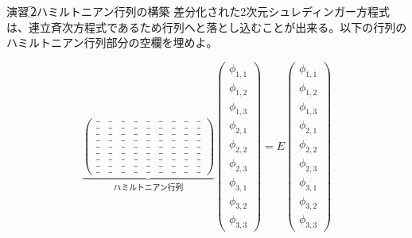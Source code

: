 \documentclass{beamer}
\begin{document}
\begin{frame}{演習\,\textcircled{2}\quad ハミルトニアン行列の構築}
    差分化された2次元シュレディンガー方程式は、連立斉次方程式であるため行列へと落とし込むことが出来る。以下の行列のハミルトニアン行列部分の空欄を埋めよ。
    \vspace{0.5em}
    
    \scriptsize
    $$
    \underbrace{
    \begin{pmatrix}
    \_ & \_ & \_ & \_ & \_ & \_ & \_ & \_ & \_ \\
    \_ & \_ & \_ & \_ & \_ & \_ & \_ & \_ & \_ \\
    \_ & \_ & \_ & \_ & \_ & \_ & \_ & \_ & \_ \\
    \hline
    \_ & \_ & \_ & \_ & \_ & \_ & \_ & \_ & \_ \\
    \_ & \_ & \_ & \_ & \_ & \_ & \_ & \_ & \_ \\
    \_ & \_ & \_ & \_ & \_ & \_ & \_ & \_ & \_ \\
    \hline
    \_ & \_ & \_ & \_ & \_ & \_ & \_ & \_ & \_ \\
    \_ & \_ & \_ & \_ & \_ & \_ & \_ & \_ & \_ \\
    \_ & \_ & \_ & \_ & \_ & \_ & \_ & \_ & \_ 
    \end{pmatrix}
    }_{\text{ハミルトニアン行列}}
    \begin{pmatrix}
    \phi_{1,1} \\ \phi_{1,2} \\ \phi_{1,3} \\
    \hline
    \phi_{2,1} \\ \phi_{2,2} \\ \phi_{2,3} \\
    \hline
    \phi_{3,1} \\ \phi_{3,2} \\ \phi_{3,3}
    \end{pmatrix}
    =
    E
    \begin{pmatrix}
    \phi_{1,1} \\ \phi_{1,2} \\ \phi_{1,3} \\
    \hline
    \phi_{2,1} \\ \phi_{2,2} \\ \phi_{2,3} \\
    \hline
    \phi_{3,1} \\ \phi_{3,2} \\ \phi_{3,3}
    \end{pmatrix}
    $$
\end{frame}
    
\end{document}
